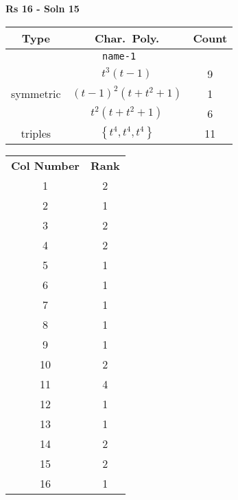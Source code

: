 \documentclass{article}
\begin{document}
    \textbf{Rs 16 - Soln 15}
    \begin{table}
    \begin{tabular}{|c|c|c|}
    \hline
    \textbf{Type} & \textbf{Char.~Poly.} & \textbf{Count} \\
    \hline \multicolumn{3}{|c|}{\texttt{name-1}} \\ \hline
    \multirow{3}{*}{symmetric}
    & $t^3(t - 1)$ & 9 \\
    & $(t - 1)^2(t + t^2 + 1)$ & 1 \\
    & $t^2(t + t^2 + 1)$ & 6 \\
    \hline
    \multirow{1}{*}{triples}
    & $\left\{t^4,t^4,t^4\right\}$ & 11 \\
    \hline
    \end{tabular}
    \end{table}
    \begin{table}
    \begin{tabular}{|c|c|}
    \hline
    \textbf{Col Number} & \textbf{Rank}\\
    1 & 2 \\ 
    2 & 1 \\ 
    3 & 2 \\ 
    4 & 2 \\ 
    5 & 1 \\ 
    6 & 1 \\ 
    7 & 1 \\ 
    8 & 1 \\ 
    9 & 1 \\ 
    10 & 2 \\ 
    11 & 4 \\ 
    12 & 1 \\ 
    13 & 1 \\ 
    14 & 2 \\ 
    15 & 2 \\ 
    16 & 1 \\ 
    \hline
    \end{tabular}
    \end{table}
    \newpage
\end{document}
